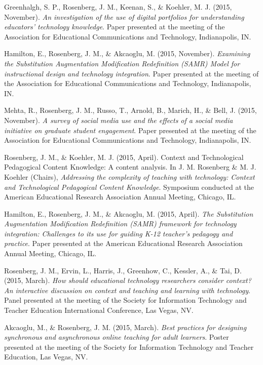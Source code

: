 \documentclass[14,]{article}
\begin{document}
Greenhalgh, S. P., Rosenberg, J. M., Keenan, S., \& Koehler, M. J.
(2015, November). \emph{An investigation of the use of digital
portfolios for understanding educators' technology knowledge}. Paper
presented at the meeting of the Association for Educational
Communications and Technology, Indianapolis, IN.

Hamilton, E., Rosenberg, J. M., \& Akcaoglu, M. (2015, November).
\emph{Examining the Substitution Augmentation Modification Redefinition
(SAMR) Model for instructional design and technology integration}. Paper
presented at the meeting of the Association for Educational
Communications and Technology, Indianapolis, IN.

Mehta, R., Rosenberg, J. M., Russo, T., Arnold, B., Marich, H., \& Bell,
J. (2015, November). \emph{A survey of social media use and the effects
of a social media initiative on graduate student engagement}. Paper
presented at the meeting of the Association for Educational
Communications and Technology, Indianapolis, IN.

Rosenberg, J. M., \& Koehler, M. J. (2015, April). Context and
Technological Pedagogical Content Knowledge: A content analysis. In J.
M. Rosenberg \& M. J. Koehler (Chairs), \emph{Addressing the complexity
of teaching with technology: Context and Technological Pedagogical
Content Knowledge}. Symposium conducted at the American Educational
Research Association Annual Meeting, Chicago, IL.

Hamilton, E., Rosenberg, J. M., \& Akcaoglu, M. (2015, April). \emph{The
Substitution Augmentation Modification Redefinition (SAMR) framework for
technology integration: Challenges to its use for guiding K-12 teacher's
pedagogy and practice}. Paper presented at the American Educational
Research Association Annual Meeting, Chicago, IL.

Rosenberg, J. M., Ervin, L., Harris, J., Greenhow, C., Kessler, A., \&
Tai, D. (2015, March). \emph{How should educational technology
researchers consider context? An interactive discussion on context and
teaching and learning with technology}. Panel presented at the meeting
of the Society for Information Technology and Teacher Education
International Conference, Las Vegas, NV.

Akcaoglu, M., \& Rosenberg, J. M. (2015, March). \emph{Best practices
for designing synchronous and asynchronous online teaching for adult
learners}. Poster presented at the meeting of the Society for
Information Technology and Teacher Education, Las Vegas, NV.
\end{document}
